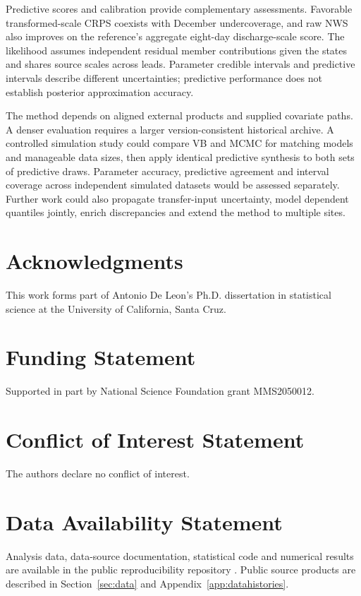 \documentclass[APA,STIX1COL]{WileyNJD-v2}
\begin{document}
Predictive scores and calibration provide complementary assessments. Favorable transformed-scale CRPS coexists with December undercoverage, and raw NWS also improves on the reference's aggregate eight-day discharge-scale score. The likelihood assumes independent residual member contributions given the states and shares source scales across leads. Parameter credible intervals and predictive intervals describe different uncertainties; predictive performance does not establish posterior approximation accuracy.

The method depends on aligned external products and supplied covariate paths. A denser evaluation requires a larger version-consistent historical archive. A controlled simulation study could compare VB and MCMC for matching models and manageable data sizes, then apply identical predictive synthesis to both sets of predictive draws. Parameter accuracy, predictive agreement and interval coverage across independent simulated datasets would be assessed separately. Further work could also propagate transfer-input uncertainty, model dependent quantiles jointly, enrich discrepancies and extend the method to multiple sites.

\section*{Acknowledgments}
This work forms part of Antonio De Leon's Ph.D. dissertation in statistical science at the University of California, Santa Cruz.

\section*{Funding Statement}
Supported in part by National Science Foundation grant MMS2050012.

\section*{Conflict of Interest Statement}
The authors declare no conflict of interest.

\section*{Data Availability Statement}
Analysis data, data-source documentation, statistical code and numerical results are available in the public reproducibility repository \citep{deleon2026sanlorenzo_reproducibility}. Public source products are described in Section~\ref{sec:data} and Appendix~\ref{app:datahistories}.
\end{document}
